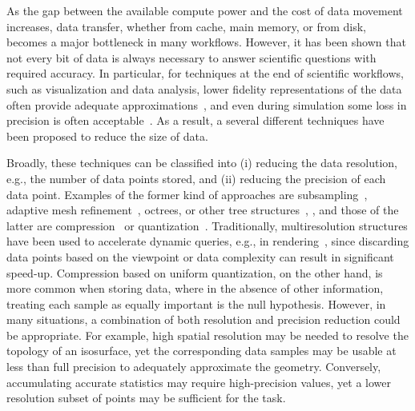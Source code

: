As the gap between the available compute power and the cost of data movement
increases, data transfer, whether from cache, main memory, or from disk,
becomes a major bottleneck in many workflows. However, it has been shown that
not every bit of data is always necessary to answer scientific questions with
required accuracy. In particular, for techniques at the end of scientific
workflows, such as visualization and data analysis, lower fidelity
representations of the data often provide adequate
approximations~\cite{woodring2011,covra2012,compression_sim2013}, and even
during simulation some loss in precision is often
acceptable~\cite{compression_sim2013,doi:10.1177/1094342018762036}. As a
result, a several different techniques have been proposed to reduce the size
of data. 

Broadly, these techniques can be classified into (i) reducing the data
resolution, e.g., the number of data points stored, and (ii) reducing the
precision of each data point.  Examples of the former kind of approaches are subsampling~\cite{idx2001},
adaptive mesh refinement~\cite{amr1989}, octrees, or other tree
structures~\cite{hierarchical1984}, , and those of the
latter are compression~\cite{fpzip,isabela,zfp2014,sz} or
quantization~\cite{vq1992,compression_domain2003,sqe}. Traditionally,
multiresolution structures have been used to accelerate dynamic queries, e.g.,
in rendering~\cite{multires_octree1999}, since discarding data points based on
the viewpoint or data complexity can result in significant speed-up.
Compression based on uniform quantization, on the other hand, is more common
when storing data, where in the absence of other information, treating each
sample as equally important is the null hypothesis. However, in many
situations, a combination of both resolution and precision reduction could be
appropriate.  For example, high spatial resolution may be needed to resolve the
topology of an isosurface, yet the corresponding data samples may be usable at
less than full precision to adequately approximate the geometry.  Conversely,
accumulating accurate statistics may require high-precision values, yet
a lower resolution subset of points may be sufficient for the task. 

